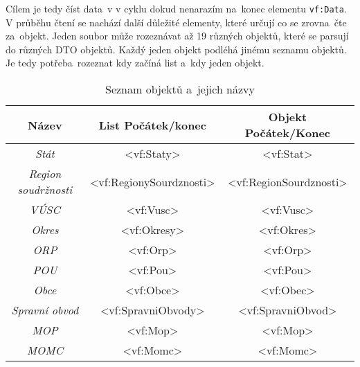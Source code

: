 Cílem je tedy číst data~v v cyklu dokud nenarazím na~konec elementu \texttt{vf:Data}.
V průběhu čtení se nachází další důležité elementy, které určují co se zrovna~čte za~objekt.
Jeden soubor může rozeznávat až 19 různých objektů, které se parsují do různých DTO objektů.
Každý jeden objekt podléhá jinému seznamu objektů.
Je tedy potřeba~rozeznat kdy začíná list a~kdy jeden objekt.
\begin{table}[!h]
    \label{tab:seznamObjektu}
    \centering
    \caption{Seznam objektů a~jejich názvy}
    \begin{tabular}{|c|c|c|}
    \hline
    \textbf{Název}                       & \textbf{List Počátek/konec}                    & \textbf{Objekt Počátek/Konec}                 \\ \hline
    \textit{Stát}                        & \textless{}vf:Staty\textgreater{}              & \textless{}vf:Stat\textgreater{}              \\ \hline
    \textit{Region soudržnosti}          & \textless{}vf:RegionySourdznosti\textgreater{} & \textless{}vf:RegionSourdznosti\textgreater{} \\ \hline
    \textit{VÚSC}                        & \textless{}vf:Vusc\textgreater{}               & \textless{}vf:Vusc\textgreater{}              \\ \hline
    \textit{Okres}                       & \textless{}vf:Okresy\textgreater{}             & \textless{}vf:Okres\textgreater{}             \\ \hline
    \textit{ORP}                         & \textless{}vf:Orp\textgreater{}                & \textless{}vf:Orp\textgreater{}               \\ \hline
    \textit{POU}                         & \textless{}vf:Pou\textgreater{}                & \textless{}vf:Pou\textgreater{}               \\ \hline
    \textit{Obce}                        & \textless{}vf:Obce\textgreater{}               & \textless{}vf:Obec\textgreater{}              \\ \hline
    \textit{Spravní obvod}               & \textless{}vf:SpravniObvody\textgreater{}      & \textless{}vf:SpravniObvod\textgreater{}      \\ \hline
    \textit{MOP}                         & \textless{}vf:Mop\textgreater{}                & \textless{}vf:Mop\textgreater{}               \\ \hline
    \textit{MOMC}                        & \textless{}vf:Momc\textgreater{}               & \textless{}vf:Momc\textgreater{}              \\ \hline

\end{tabular}
\end{table}
